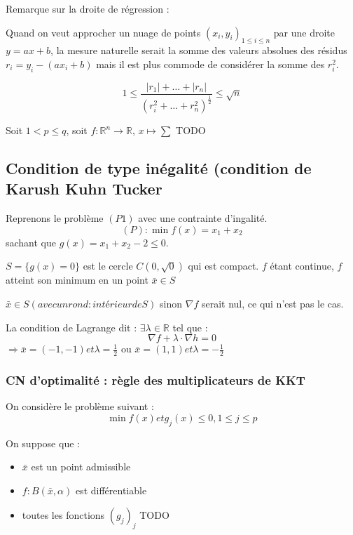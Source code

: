 
	Remarque sur la droite de régression :

	Quand on veut approcher un nuage de points $(x_i, y_i)_{1 \leq i \leq n}$ par une droite $y = ax +b$, la mesure naturelle serait la somme des valeurs absolues des résidus $r_i = y_i -(ax_i+b)$ mais il est plus commode de considérer la somme des $r_i^2$.

	\[ 1 \leq \frac{ |r_1| + \dots + |r_n| }{ (r_i^2 + \dots + r_n^2)^{\frac{1}{2}} } \leq \sqrt{n} \]
	
\begin{ex}
	Soit $1<p \leq q$, soit $f: \mathbb{R}^n \rightarrow \mathbb{R}$, $x \mapsto \sum $ TODO
	
\end{ex}

\subsection{Condition de type inégalité (condition de Karush Kuhn Tucker}

\begin{ex}
	Reprenons le problème $(P1)$ avec une contrainte d'ingalité.
	\[ (P) : \min f(x) = x_1 + x_2 \]
	sachant que $g(x) = x_1+x_2 -2 \leq 0$.
	
	$S = \{ g(x) = 0 \}$ est le cercle $C(0, \sqrt{0})$ qui est compact. $f$ étant continue, $f$ atteint son minimum en un point $\bar{x} \in S$
	
	$\bar{x} \in S(avec un rond : intérieur de S)$ sinon $\nabla f$ serait nul, ce qui n'est pas le cas.
	
	La condition de Lagrange dit : $\exists \lambda \in \mathbb{R}$ tel que : \[ \nabla f + \lambda \cdot \nabla h = 0 \]
	$\Rightarrow \bar{x} = (-1, -1) et \lambda = \frac{1}{2}$ ou $\bar{x} = (1, 1) et \lambda = -\frac{1}{2}$
	
\end{ex}
	
	\subsubsection{CN d'optimalité : règle des multiplicateurs de KKT}
	
	On considère le problème suivant : \[ \min f(x) et g_j(x) \leq 0 , 1 \leq j \leq p\]
	
	On suppose que :
\begin{itemize}
	\item $\bar{x}$ est un point admissible
	\item $f:B(\bar{x},\alpha)$ est différentiable
	\item toutes les fonctions $(g_j)_j$ TODO
\end{itemize}

